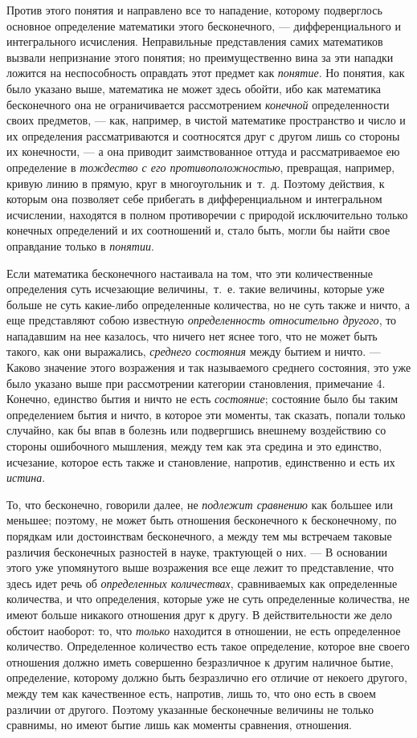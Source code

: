 Против этого понятия и направлено все то нападение, которому подверглось
основное определение математики этого бесконечного, — дифференциального и
интегрального исчисления. Неправильные представления самих математиков
вызвали непризнание этого понятия; но преимущественно вина за эти нападки
ложится на неспособность оправдать этот предмет как
{\em понятие}. Но понятия, как было указано выше,
математика не может здесь обойти, ибо как математика бесконечного она не
ограничивается рассмотрением {\em конечной}
определенности своих предметов, — как, например, в чистой математике
пространство и число и их определения рассматриваются и соотносятся друг с
другом лишь со стороны их конечности, — а она приводит заимствованное
оттуда и рассматриваемое ею определение в
{\em тождество с его противоположностью}, превращая,
например, кривую линию в прямую, круг в многоугольник и~т.~д. Поэтому
действия, к которым она позволяет себе прибегать в дифференциальном и
интегральном исчислении, находятся в полном противоречии с природой
исключительно только конечных определений и их соотношений и, стало быть,
могли бы найти свое оправдание только в {\em понятии}.

Если математика бесконечного настаивала на том, что эти количественные
определения суть исчезающие величины,~т.~е. такие величины, которые уже
больше не суть какие-либо определенные количества, но не суть также и
ничто, а еще представляют собою известную
{\em определенность относительно другого}, то
нападавшим на нее казалось, что ничего нет яснее того, что не может быть
такого, как они выражались, {\em среднего состояния}
между бытием и ничто. — Каково значение этого возражения и так называемого
среднего состояния, это уже было указано выше при рассмотрении категории
становления, примечание 4. Конечно, единство бытия и ничто не есть
{\em состояние}; состояние было бы таким определением
бытия и ничто, в которое эти моменты, так сказать, попали только случайно,
как бы впав в болезнь или подвергшись внешнему воздействию со стороны
ошибочного мышления, между тем как эта средина и это единство, исчезание,
которое есть также и становление, напротив, единственно и есть их
{\em истина}.

То, что бесконечно, говорили далее, не {\em подлежит
сравнению} как большее или меньшее; поэтому, не может быть отношения
бесконечного к бесконечному, по порядкам или достоинствам бесконечного, а
между тем мы встречаем таковые различия бесконечных разностей в науке,
трактующей о них. — В основании этого уже упомянутого выше возражения все
еще лежит то представление, что здесь идет речь об
{\em определенных количествах}, сравниваемых как
определенные количества, и что определения, которые уже не суть
определенные количества, не имеют больше никакого отношения друг к другу. В
действительности же дело обстоит наоборот: то, что
{\em только} находится в отношении, не есть
определенное количество. Определенное количество есть такое определение,
которое вне своего отношения должно иметь совершенно безразличное к другим
наличное бытие, определение, которому должно быть безразлично его отличие
от некоего другого, между тем как качественное есть, напротив, лишь то, что
оно есть в своем различии от другого. Поэтому указанные бесконечные
величины не только сравнимы, но имеют бытие лишь как моменты сравнения,
отношения.

